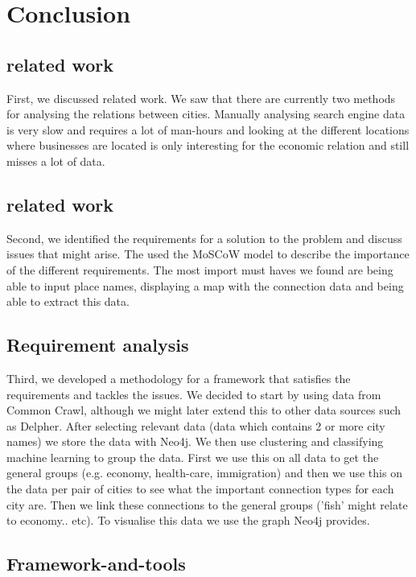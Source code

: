 \section{Conclusion}


\subsection{related work}
First, we discussed related work. We saw that there are currently two methods for analysing the relations between cities. Manually analysing search engine data is very slow and requires a lot of man-hours and looking at the different locations where businesses are located is only interesting for the economic relation and still misses a lot of data.
\\

\subsection{related work}
Second, we identified the requirements for a solution to the problem and discuss issues that might arise. The used the MoSCoW model to describe the importance of the different requirements. The most import must haves we found are being able to input place names, displaying a map with the connection data and being able to extract this data.
\\

\subsection{Requirement analysis}
Third, we developed a methodology for a framework that satisfies the requirements and tackles the issues. We decided to start by using data from Common Crawl, although we might later extend this to other data sources such as Delpher. After selecting relevant data (data which contains 2 or more city names) we store the data with Neo4j. We then use clustering and classifying machine learning to group the data. First we use this on all data to get the general groups (e.g. economy, health-care, immigration) and then we use this on the data per pair of cities to see what the important connection types for each city are. Then we link these connections to the general groups ('fish' might relate to economy.. etc). To visualise this data we use the graph Neo4j provides.

\subsection{Framework-and-tools}
